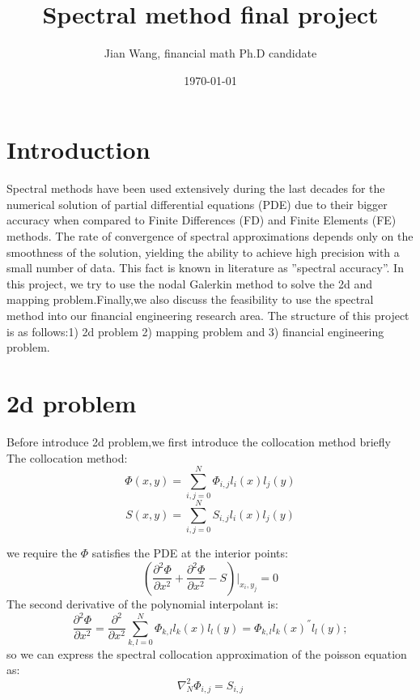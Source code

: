 \documentclass[12pt]{article}
\theoremstyle{plain}
\begin{document}
\title{Spectral method final project}

\author{Jian Wang, financial math Ph.D candidate }

\date{\today}

\maketitle


\section{Introduction}
Spectral methods have been used extensively during the last decades for the numerical solution of partial diﬀerential equations (PDE) due to their bigger accuracy when compared to Finite Diﬀerences (FD) and Finite Elements (FE) methods. The rate
of convergence of spectral approximations depends only on the smoothness of the
solution, yielding the ability to achieve high precision with a small number of data.
This fact is known in literature as ”spectral accuracy”. In this project, we try to use the nodal Galerkin method to solve the 2d and mapping problem.Finally,we also discuss the feasibility to use the spectral method into our financial engineering research area. The structure of this project is as follows:1) 2d problem 2) mapping problem and 3) financial engineering problem.\\

\section{2d problem}
Before introduce 2d problem,we first introduce the collocation method briefly\\

The collocation method:\\
\begin{equation}
\Phi(x,y)=\sum_{i,j=0}^N \Phi_{i,j}l_i(x)l_j(y)
\end{equation}
\begin{equation}
S(x,y)=\sum_{i,j=0}^N S_{i,j}l_i(x)l_j(y)
\end{equation}

we require the $\Phi$ satisfies the PDE at the interior points:
\begin{equation}
(\frac{\partial^2 \Phi}{\partial x^2}+\frac{\partial^2 \Phi}{\partial x^2}-S)|_{x_i,y_j}=0
\end{equation}
The second derivative of the polynomial interpolant is:\\
\begin{equation}
\frac{\partial^2 \Phi}{\partial x^2}=\frac{\partial^2}{\partial x^2}\sum_{k,l=0}^{N}\Phi_{k,l}{l_k}(x)l_l(y)=\Phi_{k,l}{l_k}(x)^{''}l_l(y);
\end{equation}
so we can express the spectral collocation approximation of the poisson equation as:\\
 \begin{equation}
{\nabla^2_N}\Phi_{i,j}=S_{i,j}
  \end{equation}
\end{document}
